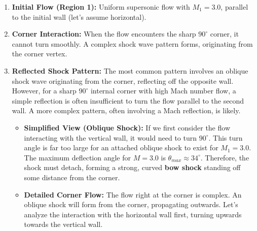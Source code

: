 \begin{enumerate}
\def\labelenumi{\arabic{enumi}.}
\item
  \textbf{Initial Flow (Region 1):} Uniform supersonic flow with
  \(M_1 = 3.0\), parallel to the initial wall (let's assume horizontal).
\item
  \textbf{Corner Interaction:} When the flow encounters the sharp
  \(90^\circ\) corner, it cannot turn smoothly. A complex shock wave
  pattern forms, originating from the corner vertex.
\item
  \textbf{Reflected Shock Pattern:} The most common pattern involves an
  oblique shock wave originating from the corner, reflecting off the
  opposite wall. However, for a sharp \(90^\circ\) internal corner with
  high Mach number flow, a simple reflection is often insufficient to
  turn the flow parallel to the second wall. A more complex pattern,
  often involving a Mach reflection, is likely.

  \begin{itemize}
  \item
    \textbf{Simplified View (Oblique Shock):} If we first consider the
    flow interacting with the vertical wall, it would need to turn
    \(90^\circ\). This turn angle is far too large for an attached
    oblique shock to exist for \(M_1=3.0\). The maximum deflection angle
    for \(M=3.0\) is \(\theta_{max} \approx 34^\circ\). Therefore, the
    shock must detach, forming a strong, curved \textbf{bow shock}
    standing off some distance from the corner.
  \item
    \textbf{Detailed Corner Flow:} The flow right at the corner is
    complex. An oblique shock will form from the corner, propagating
    outwards. Let's analyze the interaction with the horizontal wall
    first, turning upwards towards the vertical wall.


\end{itemize}
\end{enumerate}
